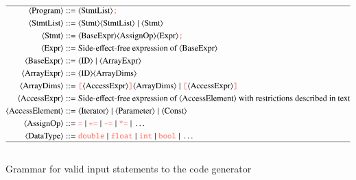 \begin{figure}[t!]    
\footnotesize
  \begin{align}
    \hline
    \langle\text{Program}\rangle ::=& \;  \langle\text{StmtList}\rangle {\color{tablecolor!60}\texttt{;}} \nonumber \\
    \langle\text{StmtList}\rangle ::=& \; \langle\text{Stmt}\rangle \langle\text{StmtList}\rangle \; | \; \langle\text{Stmt}\rangle \nonumber \\
    \langle\text{Stmt}\rangle ::=& \; \langle\text{BaseExpr}\rangle \langle\text{AssignOp}\rangle \langle\text{Expr}\rangle {\color{tablecolor!60}\texttt{;}} \nonumber \\
    \langle\text{Expr}\rangle ::=& \; \text{Side-effect-free expression of~} \langle\text{BaseExpr}\rangle \nonumber \\
    \langle\text{BaseExpr}\rangle ::=& \; \langle\text{ID}\rangle \; | \; \langle\text{ArrayExpr}\rangle \nonumber \\
    \langle\text{ArrayExpr}\rangle ::=& \; \langle\text{ID}\rangle \langle\text{ArrayDims}\rangle \nonumber \\
    \langle\text{ArrayDims}\rangle ::=& \; {\color{tablecolor!60}\texttt{[}}\langle\text{AccessExpr}\rangle {\color{tablecolor!60}\texttt{]}} \langle\text{ArrayDims}\rangle \; | \; {\color{tablecolor!60}\texttt{[}}\langle\text{AccessExpr}\rangle {\color{tablecolor!60}\texttt{]}} \nonumber \\
    \langle\text{AccessExpr}\rangle ::=& \; \text{Side-effect-free expression of~} \langle\text{AccessElement}\rangle \text{ with restrictions described in text}\nonumber \\
	\langle\text{AccessElement}\rangle ::=& \; \langle\text{Iterator}\rangle \; | \; \langle\text{Parameter}\rangle \; | \; \langle\text{Const}\rangle \nonumber \\
    \langle\text{AssignOp}\rangle ::=& \; {\color{tablecolor!60}\texttt{=}} \; | \; {\color{tablecolor!60}\texttt{+=}} \; | \; {\color{tablecolor!60}\texttt{-=}} \; | \; {\color{tablecolor!60}\texttt{*=}} \; | \; \ldots \nonumber  \\
    \langle\text{DataType}\rangle ::=& \; {\color{tablecolor!60}\texttt{double}} \; | \; {\color{tablecolor!60}\texttt{float}} \; | \; {\color{tablecolor!60}\texttt{int}} \; | \; {\color{tablecolor!60}\texttt{bool}} \; | \; \ldots \nonumber  \\
    \hline \nonumber
  \end{align}
\vspace*{-0.6cm}
  \caption{Grammar for valid input statements to the code generator}
\label{fig:start-grammar}
\end{figure}


